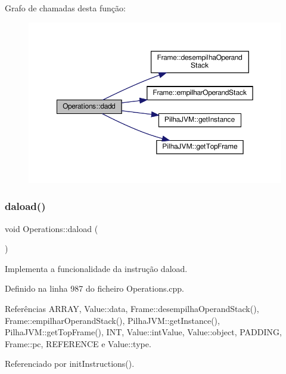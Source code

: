 Grafo de chamadas desta função\+:
\nopagebreak
\begin{figure}[H]
\begin{center}
\leavevmode
\includegraphics[width=350pt]{classOperations_a8a23241bed8c033ab75994a18bf2a702_cgraph}
\end{center}
\end{figure}
\mbox{\label{classOperations_a63691de547749780c372e285bd6a97bc}} 
\subsubsection{\texorpdfstring{daload()}{daload()}}
{\footnotesize\ttfamily void Operations\+::daload (\begin{DoxyParamCaption}{ }\end{DoxyParamCaption})\hspace{0.3cm}{\ttfamily [private]}}



Implementa a funcionalidade da instrução daload. 



Definido na linha 987 do ficheiro Operations.\+cpp.



Referências A\+R\+R\+AY, Value\+::data, Frame\+::desempilha\+Operand\+Stack(), Frame\+::empilhar\+Operand\+Stack(), Pilha\+J\+V\+M\+::get\+Instance(), Pilha\+J\+V\+M\+::get\+Top\+Frame(), I\+NT, Value\+::int\+Value, Value\+::object, P\+A\+D\+D\+I\+NG, Frame\+::pc, R\+E\+F\+E\+R\+E\+N\+CE e Value\+::type.



Referenciado por init\+Instructions().

